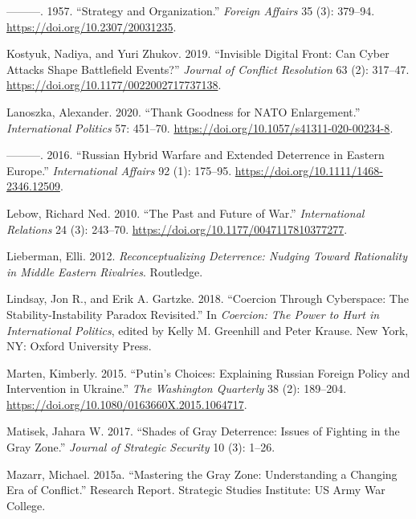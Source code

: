 \documentclass[
]{article}
\begin{document}
\leavevmode\hypertarget{ref-kissinger_strategyorganization_1957}{}%
---------. 1957. ``Strategy and Organization.'' \emph{Foreign Affairs} 35 (3): 379--94. \url{https://doi.org/10.2307/20031235}.

\leavevmode\hypertarget{ref-kostyuk_invisibledigitalfront_2019}{}%
Kostyuk, Nadiya, and Yuri Zhukov. 2019. ``Invisible Digital Front: Can Cyber Attacks Shape Battlefield Events?'' \emph{Journal of Conflict Resolution} 63 (2): 317--47. \url{https://doi.org/10.1177/0022002717737138}.

\leavevmode\hypertarget{ref-lanoszka_thankgoodnessnato_2020}{}%
Lanoszka, Alexander. 2020. ``Thank Goodness for NATO Enlargement.'' \emph{International Politics} 57: 451--70. \url{https://doi.org/10.1057/s41311-020-00234-8}.

\leavevmode\hypertarget{ref-lanoszka_russianhybridwarfare_2016}{}%
---------. 2016. ``Russian Hybrid Warfare and Extended Deterrence in Eastern Europe.'' \emph{International Affairs} 92 (1): 175--95. \url{https://doi.org/10.1111/1468-2346.12509}.

\leavevmode\hypertarget{ref-lebow_futurewar_2010}{}%
Lebow, Richard Ned. 2010. ``The Past and Future of War.'' \emph{International Relations} 24 (3): 243--70. \url{https://doi.org/10.1177/0047117810377277}.

\leavevmode\hypertarget{ref-lieberman_reconceptualizingdeterrencenudging_2012}{}%
Lieberman, Elli. 2012. \emph{Reconceptualizing Deterrence: Nudging Toward Rationality in Middle Eastern Rivalries}. Routledge.

\leavevmode\hypertarget{ref-lindsay_coercioncyberspacestabilityinstability_2018}{}%
Lindsay, Jon R., and Erik A. Gartzke. 2018. ``Coercion Through Cyberspace: The Stability-Instability Paradox Revisited.'' In \emph{Coercion: The Power to Hurt in International Politics}, edited by Kelly M. Greenhill and Peter Krause. New York, NY: Oxford University Press.

\leavevmode\hypertarget{ref-marten_putinchoicesexplaining_2015}{}%
Marten, Kimberly. 2015. ``Putin's Choices: Explaining Russian Foreign Policy and Intervention in Ukraine.'' \emph{The Washington Quarterly} 38 (2): 189--204. \url{https://doi.org/10.1080/0163660X.2015.1064717}.

\leavevmode\hypertarget{ref-matisek_shadesgraydeterrence_2017}{}%
Matisek, Jahara W. 2017. ``Shades of Gray Deterrence: Issues of Fighting in the Gray Zone.'' \emph{Journal of Strategic Security} 10 (3): 1--26.

\leavevmode\hypertarget{ref-mazarr_masteringgrayzone_2015}{}%
Mazarr, Michael. 2015a. ``Mastering the Gray Zone: Understanding a Changing Era of Conflict.'' Research Report. Strategic Studies Institute: US Army War College.
\end{document}
